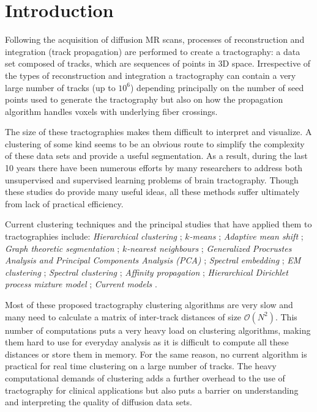 \documentclass[preprint,authoryear,a4paper,10pt,onecolumn]{elsarticle}
\begin{document}
\section{Introduction}

Following the acquisition of diffusion MR scans, processes of
reconstruction and integration (track propagation) are performed to
create a tractography: a data set composed of tracks, which are
sequences of points in 3D space. Irrespective of the types of
reconstruction and integration a tractography can contain a very large
number of tracks (up to $10^6$) depending principally on the number of
seed points used to generate the tractography but also on how the
propagation algorithm handles voxels with underlying fiber crossings.

The size of these tractographies makes them difficult to interpret and
visualize. A clustering of some kind seems to be an obvious route to
simplify the complexity of these data sets and provide a useful
segmentation.  As a result, during the last 10 years there have been
numerous efforts by many researchers to address both unsupervised and
supervised learning problems of brain tractography. Though these studies
do provide many useful ideas, all these methods suffer ultimately from
lack of practical efficiency.

Current clustering techniques and the principal studies that have applied them to tractographies include:
\textit{Hierarchical clustering} \citep{Visser2010,
  gerig2004analysis, Guevara2010, zhang2005dti, jianu2009exploring};
\textit{$k$-means} \citep{ElKouby2005, Tsai2007}; \textit{Adaptive mean
  shift} \citep{zvitia2008adaptive, Zvitia2010}; \textit{Graph theoretic
  segmentation} \citep{brun2004clustering}; \textit{$k$-nearest
  neighbours} \citep{Ding2003a}; \textit{Generalized Procrustes Analysis
  and Principal Components Analysis (PCA)} \citep{Corouge2004,
  corouge2004towards, Corouge2006}; \textit{Spectral embedding}
\citep{ODonnell_IEEETMI07}; \textit{EM clustering}
\citep{Maddah_MICCA2005, maddah2006statistical, Maddah_IEEEBI2008,
  ziyan2009consistency}; \textit{Spectral clustering}
\citep{jonasson2005fiber}; \textit{Affinity propagation}
\citep{leemans17new, malcolm2009filtered}; \textit{Hierarchical
  Dirichlet process mixture model} \citep{wang2010tractography};
\textit{Current models} \citep{Durrleman2009,
  durrleman2010registration}.

Most of these proposed tractography clustering algorithms are very slow and many
need to calculate a matrix of inter-track distances of size $\mathcal{O}(N^2)$.
This number of computations puts a very heavy load on clustering algorithms,
making them hard to use for everyday analysis as it is difficult to compute all
these distances or store them in memory. For the same reason, no current
algorithm is practical for real time clustering on a large number of tracks. The
heavy computational demands of clustering adds a further overhead to the use of
tractography for clinical applications but also puts a barrier on understanding
and interpreting the quality of diffusion data sets.
\end{document}
